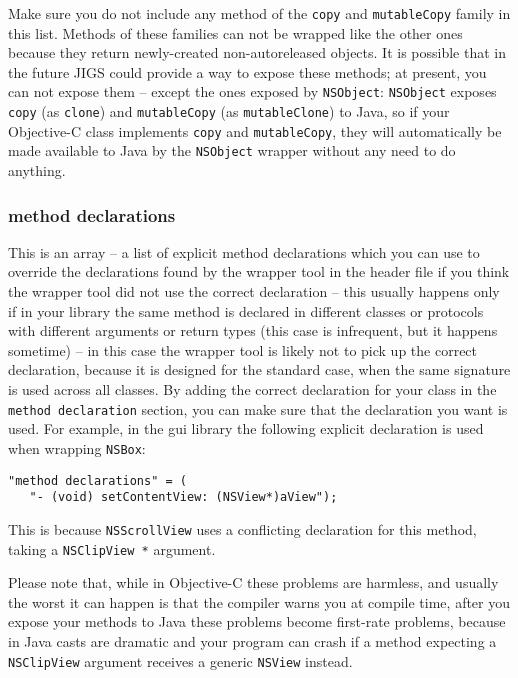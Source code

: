 Make sure you do not include any method of the \texttt{copy} and 
\texttt{mutableCopy} family in this list.  Methods of these families 
can not be wrapped like the other ones because they return
newly-created non-autoreleased objects.  It is possible that in the
future JIGS could provide a way to expose these methods; at present,
you can not expose them -- except the ones exposed by \texttt{NSObject}: 
\texttt{NSObject} exposes \texttt{copy} (as \texttt{clone}) and 
\texttt{mutableCopy} (as \texttt{mutableClone}) to Java, so if your 
Objective-C class implements \texttt{copy} and \texttt{mutableCopy},
they will automatically be made available to Java by the
\texttt{NSObject} wrapper without any need to do anything.

\subsubsection{method declarations}
This is an array -- a list of explicit method declarations which you
can use to override the declarations found by the wrapper tool in the
header file if you think the wrapper tool did not use the correct
declaration -- this usually happens only if in your library the same
method is declared in different classes or protocols with different
arguments or return types (this case is infrequent, but it happens
sometime) -- in this case the wrapper tool is likely not to pick up
the correct declaration, because it is designed for the standard case,
when the same signature is used across all classes.  By adding the
correct declaration for your class in the \texttt{method declaration}
section, you can make sure that the declaration you want is used.  For
example, in the gui library the following explicit declaration is used
when wrapping
\texttt{NSBox}:
\begin{verbatim}
"method declarations" = (
   "- (void) setContentView: (NSView*)aView");
\end{verbatim}
This is because \texttt{NSScrollView} uses a conflicting declaration
for this method, taking a \texttt{NSClipView *} argument.

Please note that, while in Objective-C these problems are harmless,
and usually the worst it can happen is that the compiler warns you at
compile time, after you expose your methods to Java these problems
become first-rate problems, because in Java casts are dramatic and
your program can crash if a method expecting a \texttt{NSClipView}
argument receives a generic \texttt{NSView} instead.

